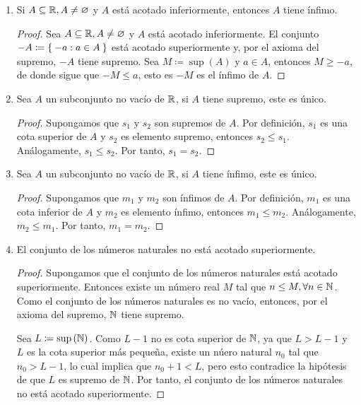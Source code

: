\begin{enumerate}[label=\roman*)]
  \item Si $A\subseteq \mathbb{R}, A\neq \varnothing$ y $A$ está acotado inferiormente, entonces $A$ tiene ínfimo.
  \begin{proof}\leavevmode
    Sea $A\subseteq \mathbb{R}, A\neq \varnothing$ y $A$ está acotado inferiormente. El conjunto $-A \coloneqq \Set{-a: a\in A}$ está acotado superiormente y, por el axioma del supremo, $-A$ tiene supremo. Sea $M\coloneqq \sup{(A)}$ y $a\in A$, entonces $M\geq -a$, de donde sigue que $-M\leq a$, esto es $-M$ es el ínfimo de $A$.
  \end{proof}
  
  \item Sea $A$ un subconjunto no vacío de $\mathbb{R}$, si $A$ tiene supremo, este es único.
 
  \begin{proof} 
   Supongamos que $s_1$ y $s_2$ son supremos de $A$. Por definición, $s_1$ es una cota superior de $A$ y $s_2$ es elemento supremo, entonces $s_2\leq s_1$. Análogamente, $s_1\leq s_2$. Por tanto, $s_1=s_2$.
  \end{proof}
 
  \item Sea $A$ un subconjunto no vacío de $\mathbb{R}$, si $A$ tiene ínfimo, este es único.
  
  \begin{proof} 
   Supongamos que $m_1$ y $m_2$ son ínfimos de $A$. Por definición, $m_1$ es una cota inferior de $A$ y $m_2$ es elemento ínfimo, entonces $m_1\leq m_2$. Análogamente, $m_2\leq m_1$. Por tanto, $m_1=m_2$. 
  \end{proof}
  
  \item El conjunto de los números naturales no está acotado superiormente.
  \begin{proof}\leavevmode
    Supongamos que el conjunto de los números naturales está acotado superiormente. Entonces existe un número real $M$ tal que $n\leq M, \forall n\in \mathbb{N}$. Como el conjunto de los números naturales es no vacío, entonces, por el axioma del supremo, $\mathbb{N}$ tiene supremo.

    Sea $L\coloneqq \sup{(\mathbb{N})}$. Como $L-1$ no es cota superior de $\mathbb{N}$, ya que $L>L-1$ y $L$ es la cota superior más pequeña, existe un núero natural $n_0$ tal que $n_0>L-1$, lo cual implica que $n_0+1<L$, pero esto contradice la hipótesis	de que $L$ es supremo de $\mathbb{N}$. Por tanto, el conjunto de los números naturales no está acotado superiormente.
  \end{proof}
  

\end{enumerate}
